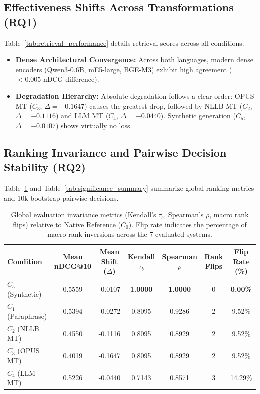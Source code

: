 \documentclass[runningheads]{llncs}
\begin{document}
\subsection{Effectiveness Shifts Across Transformations (RQ1)}
Table~\ref{tab:retrieval_performance} details retrieval scores across all conditions.
\begin{itemize}
    \item \textbf{Dense Architectural Convergence:} Across both languages, modern dense encoders (Qwen3-0.6B, mE5-large, BGE-M3) exhibit high agreement ($< 0.005$ nDCG difference).
    \item \textbf{Degradation Hierarchy:} Absolute degradation follows a clear order: OPUS MT ($C_3$, $\Delta = -0.1647$) causes the greatest drop, followed by NLLB MT ($C_2$, $\Delta = -0.1116$) and LLM MT ($C_4$, $\Delta = -0.0440$). Synthetic generation ($C_5$, $\Delta = -0.0107$) shows virtually no loss.
\end{itemize}

\subsection{Ranking Invariance and Pairwise Decision Stability (RQ2)}
Table~\ref{tab:invariance_summary} and Table~\ref{tab:significance_summary} summarize global ranking metrics and 10k-bootstrap pairwise decisions.

\begin{table}[t]
\centering
\caption{Global evaluation invariance metrics (Kendall's $\tau_b$, Spearman's $\rho$, macro rank flips) relative to Native Reference ($C_0$). Flip rate indicates the percentage of macro rank inversions across the 7 evaluated systems.}
\label{tab:invariance_summary}
\begin{tabular}{lcccccc}
\toprule
\textbf{Condition} & \textbf{Mean nDCG@10} & \textbf{Mean Shift ($\Delta$)} & \textbf{Kendall $\tau_b$} & \textbf{Spearman $\rho$} & \textbf{Rank Flips} & \textbf{Flip Rate (\%)} \\
\midrule
$C_5$ (Synthetic) & 0.5559 & -0.0107 & \textbf{1.0000} & \textbf{1.0000} & 0 & \textbf{0.00\%} \\
$C_1$ (Paraphrase) & 0.5394 & -0.0272 & 0.8095 & 0.9286 & 2 & 9.52\% \\
$C_2$ (NLLB MT) & 0.4550 & -0.1116 & 0.8095 & 0.8929 & 2 & 9.52\% \\
$C_3$ (OPUS MT) & 0.4019 & -0.1647 & 0.8095 & 0.8929 & 2 & 9.52\% \\
$C_4$ (LLM MT) & 0.5226 & -0.0440 & 0.7143 & 0.8571 & 3 & 14.29\% \\
\bottomrule
\end{tabular}
\end{table}
\end{document}

